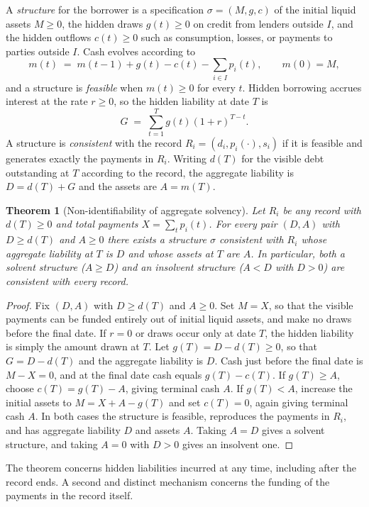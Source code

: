 \documentclass[11pt]{article}
\newtheorem{theorem}{Theorem}[section]
\theoremstyle{definition}
\theoremstyle{remark}
\begin{document}
A \emph{structure} for the borrower is a specification $\sigma=(M,g,c)$ of the initial liquid assets $M\ge 0$, the hidden draws $g(t)\ge 0$ on credit from lenders outside $I$, and the hidden outflows $c(t)\ge 0$ such as consumption, losses, or payments to parties outside $I$. Cash evolves according to
\[
m(t) \;=\; m(t-1) + g(t) - c(t) - \sum_{i\in I}p_i(t),\qquad m(0)=M,
\]
and a structure is \emph{feasible} when $m(t)\ge 0$ for every $t$. Hidden borrowing accrues interest at the rate $r\ge 0$, so the hidden liability at date $T$ is
\[
G \;=\; \sum_{t=1}^{T}g(t)(1+r)^{T-t}.
\]
A structure is \emph{consistent} with the record $R_i=(d_i,p_i(\cdot),s_i)$ if it is feasible and generates exactly the payments in $R_i$. Writing $d(T)$ for the visible debt outstanding at $T$ according to the record, the aggregate liability is $D=d(T)+G$ and the assets are $A=m(T)$.

\begin{theorem}[Non-identifiability of aggregate solvency]\label{thm:nonid}
Let $R_i$ be any record with $d(T)\ge 0$ and total payments $X=\sum_{t}p_i(t)$. For every pair $(D,A)$ with $D\ge d(T)$ and $A\ge 0$ there exists a structure $\sigma$ consistent with $R_i$ whose aggregate liability at $T$ is $D$ and whose assets at $T$ are $A$. In particular, both a solvent structure ($A\ge D$) and an insolvent structure ($A<D$ with $D>0$) are consistent with every record.
\end{theorem}

\begin{proof}
Fix $(D,A)$ with $D\ge d(T)$ and $A\ge 0$. Set $M=X$, so that the visible payments can be funded entirely out of initial liquid assets, and make no draws before the final date. If $r=0$ or draws occur only at date $T$, the hidden liability is simply the amount drawn at $T$. Let $g(T)=D-d(T)\ge 0$, so that $G=D-d(T)$ and the aggregate liability is $D$. Cash just before the final date is $M-X=0$, and at the final date cash equals $g(T)-c(T)$. If $g(T)\ge A$, choose $c(T)=g(T)-A$, giving terminal cash $A$. If $g(T)<A$, increase the initial assets to $M=X+A-g(T)$ and set $c(T)=0$, again giving terminal cash $A$. In both cases the structure is feasible, reproduces the payments in $R_i$, and has aggregate liability $D$ and assets $A$. Taking $A=D$ gives a solvent structure, and taking $A=0$ with $D>0$ gives an insolvent one.
\end{proof}

The theorem concerns hidden liabilities incurred at any time, including after the record ends. A second and distinct mechanism concerns the funding of the payments in the record itself.
\end{document}
